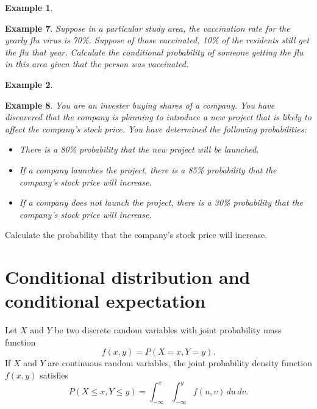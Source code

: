 \documentclass[
]{book}
\theoremstyle{definition}
\theoremstyle{definition}
\newtheorem{example}{Example}[chapter]
\theoremstyle{definition}
\theoremstyle{definition}
\theoremstyle{remark}
\begin{document}
\begin{example}
\protect\hypertarget{exm:unlabeled-div-7}{}\label{exm:unlabeled-div-7}

\textbf{Example 7}. \emph{Suppose in a particular study area, the vaccination rate
for the yearly flu virus is 70\%. Suppose of those vaccinated, 10\% of the
residents still get the flu that year. Calculate the conditional
probability of someone getting the flu in this area given that the
person was vaccinated.}

\end{example}

\begin{example}
\protect\hypertarget{exm:unlabeled-div-8}{}\label{exm:unlabeled-div-8}

\textbf{Example 8}. \emph{You are an invester buying shares of a company. You have
discovered that the company is planning to introduce a new project that
is likely to affect the company's stock price. You have determined the
following probabilities:}

\begin{itemize}
\item
  \emph{There is a 80\% probability that the new project will be launched.}
\item
  \emph{If a company launches the project, there is a 85\% probability that
  the company's stock price will increase.}
\item
  \emph{If a company does not launch the project, there is a 30\%
  probability that the company's stock price will increase.}
\end{itemize}

\end{example}

Calculate the probability that the company's stock price will increase.

\hypertarget{conditional-distribution-and-conditional-expectation}{%
\section{Conditional distribution and conditional expectation}\label{conditional-distribution-and-conditional-expectation}}

Let \(X\) and \(Y\) be two discrete random variables with joint probability
mass function \[f(x,y) = P(X = x, Y = y).\] If \(X\) and \(Y\) are
continuous random variables, the joint probability density function
\(f (x, y)\) satisfies
\[P( X \le x, Y \le y) = \int_{-\infty}^x \int_{-\infty}^y f(u,v) \, du\, dv.\]
\end{document}
